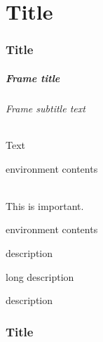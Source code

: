 \documentclass[compress,red]{beamer}
\theoremstyle{definition}
\theoremstyle{remark}
\begin{document}

\part{Title}

\section[Short title]{Title}

\begin{frame}
\frametitle{Frame title}\framesubtitle{Frame subtitle text}
 Text
\\[1em]
\begin{structureenv}
environment contents
\end{structureenv}
\\[1em]
This is \alert{important}.
\\[1em]
\begin{alertenv}
environment contents
\end{alertenv}
\vspace{1em}
\begin{description}
\item[label] description
\item[long label] long description
\item[longest label] description
\end{description}
\end{frame}

\section[Short title]{Title}
\end{document}
